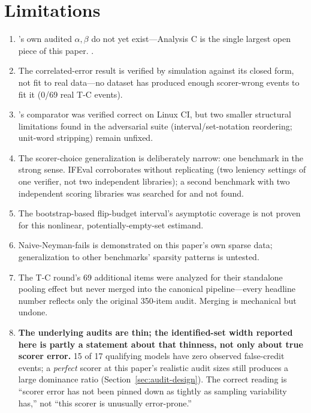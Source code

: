 \section{Limitations}
\label{sec:limitations}

\begin{enumerate}\itemsep2pt
  \item \exactmatch's own audited $\alpha,\beta$ do not yet exist---Analysis
  C is the single largest open piece of this paper.
  .

  \item The correlated-error result is verified by simulation against its
  closed form, not fit to real data---no dataset has produced enough
  scorer-wrong events to fit it (0/69 real T-C events).

  \item \scoreboxed's comparator was verified correct on Linux CI, but two
  smaller structural limitations found in the adversarial suite
  (interval/set-notation reordering; unit-word stripping) remain unfixed.

  \item The scorer-choice generalization is deliberately narrow: one
  benchmark in the strong sense. IFEval corroborates without replicating
  (two leniency settings of one verifier, not two independent libraries); a
  second benchmark with two independent scoring libraries was searched for
  and not found.

  \item The bootstrap-based flip-budget interval's asymptotic coverage is
  not proven for this nonlinear, potentially-empty-set estimand.

  \item Naive-Neyman-fails is demonstrated on this paper's own sparse data;
  generalization to other benchmarks' sparsity patterns is untested.

  \item The T-C round's 69 additional items were analyzed for their
  standalone pooling effect but never merged into the canonical
  pipeline---every headline number reflects only the original 350-item
  audit. Merging is mechanical but undone.

  \item \textbf{The underlying audits are thin; the identified-set width
  reported here is partly a statement about that thinness, not only about
  true scorer error.} 15 of 17 qualifying models have zero observed
  false-credit events; a \emph{perfect} scorer at this paper's realistic
  audit sizes still produces a large dominance ratio (Section~\ref{sec:audit-design}).
  The correct reading is ``scorer error has not been pinned down as
  tightly as sampling variability has,'' not ``this scorer is unusually
  error-prone.''


\end{enumerate}
